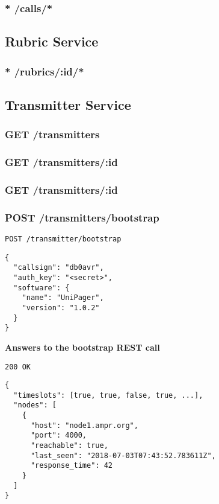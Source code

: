 \subsubsection{* /calls/*}


\subsection{Rubric Service}

\subsubsection{* /rubrics/:id/*}


\subsection{Transmitter Service}

\subsubsection{GET /transmitters}

\subsubsection{GET /transmitters/:id}

\subsubsection{GET /transmitters/:id}

\subsubsection{POST /transmitters/bootstrap}
\label{protcoldef:transmitters:bootstrap}
\texttt{POST /transmitter/bootstrap}
\begin{lstlisting}
{
  "callsign": "db0avr",
  "auth_key": "<secret>",
  "software": {
    "name": "UniPager",
    "version": "1.0.2"
  }
}
\end{lstlisting}

\textbf{Answers to the bootstrap REST call}

\texttt{200 OK}
\begin{lstlisting}
{
  "timeslots": [true, true, false, true, ...],
  "nodes": [
    {
      "host": "node1.ampr.org",
      "port": 4000,
      "reachable": true,
      "last_seen": "2018-07-03T07:43:52.783611Z",
      "response_time": 42
    }
  ]
}
\end{lstlisting}

